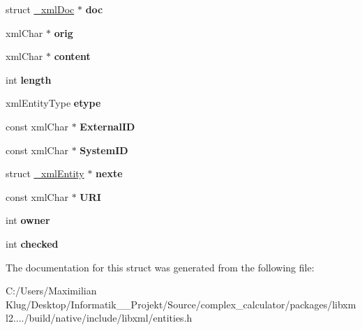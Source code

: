 \begin{DoxyCompactItemize}
\mbox{\label{struct__xml_entity_adfa8770d70ba762a556cc525b578232a}} 
struct \mbox{\hyperlink{struct__xml_doc}{\+\_\+xml\+Doc}} $\ast$ {\bfseries doc}
\item 
\mbox{\label{struct__xml_entity_a0d61b0e8cf6a2b5c5a93bba7de2c389a}} 
xml\+Char $\ast$ {\bfseries orig}
\item 
\mbox{\label{struct__xml_entity_a3a6e1d76537e03d0187f264e9c2cc6c5}} 
xml\+Char $\ast$ {\bfseries content}
\item 
\mbox{\label{struct__xml_entity_a2be272ed0fa826273581be4342e8c1aa}} 
int {\bfseries length}
\item 
\mbox{\label{struct__xml_entity_a7c77f01ae8584f35322960c9af2c44f1}} 
xml\+Entity\+Type {\bfseries etype}
\item 
\mbox{\label{struct__xml_entity_a88219df7a050603dace4d7927295550c}} 
const xml\+Char $\ast$ {\bfseries External\+ID}
\item 
\mbox{\label{struct__xml_entity_a151ac2dba106b8037c9c3caef0b3800e}} 
const xml\+Char $\ast$ {\bfseries System\+ID}
\item 
\mbox{\label{struct__xml_entity_a0e15a609099a953539fba75528f9a1aa}} 
struct \mbox{\hyperlink{struct__xml_entity}{\+\_\+xml\+Entity}} $\ast$ {\bfseries nexte}
\item 
\mbox{\label{struct__xml_entity_a5b15c128b50ab54749a65045966f50a5}} 
const xml\+Char $\ast$ {\bfseries U\+RI}
\item 
\mbox{\label{struct__xml_entity_ae649c00dd7685e9ec5cdc8e907fb62e7}} 
int {\bfseries owner}
\item 
\mbox{\label{struct__xml_entity_a8d02912e453726ef10dce4e48dd7ba78}} 
int {\bfseries checked}
\end{DoxyCompactItemize}


The documentation for this struct was generated from the following file\+:\begin{DoxyCompactItemize}
\item 
C\+:/\+Users/\+Maximilian Klug/\+Desktop/\+Informatik\+\_\+\_\+\+Projekt/\+Source/complex\+\_\+calculator/packages/libxml2..../build/native/include/libxml/entities.\+h\end{DoxyCompactItemize}
